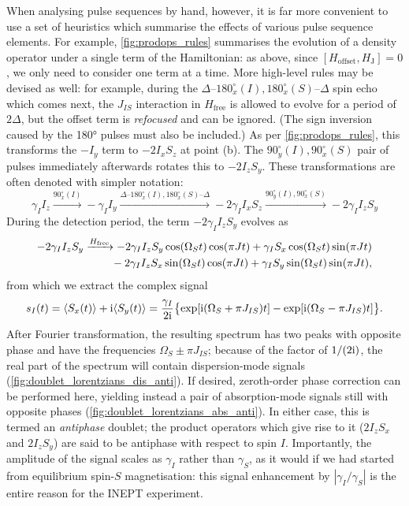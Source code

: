 When analysing pulse sequences by hand, however, it is far more convenient to use a set of heuristics which summarise the effects of various pulse sequence elements.
For example, \cref{fig:prodops_rules} summarises the evolution of a density operator under a single term of the Hamiltonian: as above, since $[H_\text{offset}, H_\text{J}] = 0$, we only need to consider one term at a time.
More high-level rules may be devised as well: for example, during the $\Delta\text{--}180^\circ_{x}(I),180^\circ_{x}(S)\text{--}\Delta$ spin echo which comes next, the $J_{IS}$ interaction in $H_\text{free}$ is allowed to evolve for a period of $2\Delta$, but the offset term is \textit{refocused} and can be ignored.
(The sign inversion caused by the \ang{180} pulses must also be included.)
As per \cref{fig:prodops_rules}, this transforms the $-I_y$ term
to $-2I_xS_z$ at point (b).
The $90^\circ_y(I),90^\circ_x(S)$ pair of pulses immediately afterwards rotates this to $-2I_zS_y$.
These transformations are often denoted with simpler notation:
\begin{equation}
    \label{eq:inept_prodop}
    \gamma_I I_z
    \xrightarrow{90^\circ_x(I)} -\gamma_I I_y
    \xrightarrow{\Delta\text{--}180^\circ_{x}(I),180^\circ_{x}(S)\text{--}\Delta} -2\gamma_I I_xS_z
    \xrightarrow{90^\circ_y(I),90^\circ_x(S)} -2\gamma_I I_zS_y
\end{equation}
During the detection period, the term $-2\gamma_II_zS_y$ evolves as
\begin{align}
    \label{eq:inept_fid_prodop}
    -2\gamma_I I_zS_y \xrightarrow{H_\text{free}} -2\gamma_I I_zS_y\cos(\Omega_St)\cos(\pi Jt) + \gamma_I S_x\cos(\Omega_St)\sin(\pi Jt) \notag{} \\
    \qquad {} - 2\gamma_I I_zS_x\sin(\Omega_St)\cos(\pi Jt) + \gamma_I S_y\sin(\Omega_S t)\sin(\pi Jt),
\end{align}
from which we extract the complex signal
\begin{equation}
    \label{eq:inept_fid}
    s_I(t) = \langle S_x(t) \rangle + \mathrm{i} \langle S_y(t) \rangle = \frac{\gamma_I}{2\mathrm{i}}\bigl\{\exp[\mathrm{i}(\Omega_S + \pi J_{IS})t] - \exp[\mathrm{i}(\Omega_S - \pi J_{IS})t]\bigr\}.
\end{equation}
After Fourier transformation, the resulting spectrum has two peaks with opposite phase and have the frequencies $\Omega_S \pm \pi J_{IS}$; because of the factor of $1/(2\mathrm{i})$, the real part of the spectrum will contain dispersion-mode signals (\cref{fig:doublet_lorentzians_dis_anti}).
If desired, zeroth-order phase correction can be performed here, yielding instead a pair of absorption-mode signals still with opposite phases (\cref{fig:doublet_lorentzians_abs_anti}).
In either case, this is termed an \textit{antiphase} doublet; the product operators which give rise to it ($2I_zS_x$ and $2I_zS_y$) are said to be antiphase with respect to spin $I$.
Importantly, the amplitude of the signal scales as $\gamma_I$ rather than $\gamma_S$, as it would if we had started from equilibrium spin-$S$ magnetisation: this signal enhancement by $|\gamma_I / \gamma_S|$ is the entire reason for the INEPT experiment.

